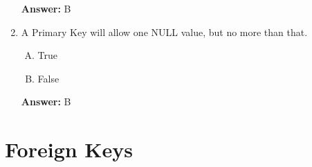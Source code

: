 \documentclass[12pt]{article}
\begin{document}
\begin{enumerate}[1.]
    \bigskip

    \textbf{Answer:} B

    \item

    A Primary Key will allow one NULL value, but no more than that.

    \bigskip

    \begin{enumerate}[A.]
        \item True
        \item False
    \end{enumerate}

    \bigskip

    \textbf{Answer:} B

\end{enumerate}

\bigskip

\section{Foreign Keys}

\bigskip
\end{document}
